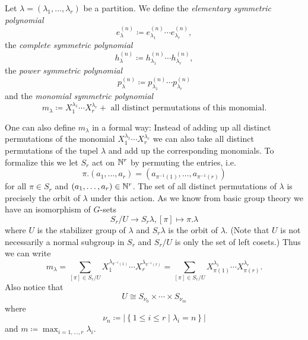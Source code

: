 \begin{defi}
  Let $\lambda = (\lambda_1, \dotsc, \lambda_r)$ be a partition. We define the \emph{elementary symmetric polynomial}
  \[
              e^{(n)}_\lambda
    \coloneqq e^{(n)}_{\lambda_1} \dotsm e^{(n)}_{\lambda_r},
  \]
  the \emph{complete symmetric polynomial}
  \[
              h^{(n)}_\lambda
    \coloneqq h^{(n)}_{\lambda_1} \dotsm h^{(n)}_{\lambda_r},
  \]
  the \emph{power symmetric polynomial}
  \[
              p^{(n)}_\lambda
    \coloneqq p^{(n)}_{\lambda_1} \dotsm p^{(n)}_{\lambda_r}
  \]
  and the \emph{monomial symmetric polynomial}
  \[
              m_\lambda
    \coloneqq   X_1^{\lambda_1} \dotsm X_r^{\lambda_r}
              + \text{ all distinct permutations of this monomial}.
  \]
\end{defi}


One can also define $m_\lambda$ in a formal way:
Instead of adding up all distinct permutations of the monomial $X_1^{\lambda_1} \dotsm X_r^{\lambda_r}$ we can also take all distinct permutations of the tupel $\lambda$ and add up the corresponding monomials.
To formalize this we let $S_r$ act on $\mathbb{N}^r$ by permuting the entries, i.e.\
\[
    \pi.(a_1, \dotsc, a_r)
  = \left( a_{\pi^{-1}(1)}, \dotsc, a_{\pi^{-1}(r)} \right)
\]
for all $\pi \in S_r$ and $(a_1, \dotsc, a_r) \in \mathbb{N}^r$.
The set of all distinct permutations of $\lambda$ is precisely the orbit of $\lambda$ under this action.
As we know from basic group theory we have an isomorphism of $G$-sets
\[
          S_r / U
  \to     S_r \lambda,
          [\pi]
  \mapsto \pi.\lambda
\]
where $U$ is the stabilizer group of $\lambda$ and $S_r \lambda$ is the orbit of $\lambda$.
(Note that $U$ is not necessarily a normal subgroup in $S_r$ and $S_r/U$ is only the set of left cosets.)
Thus we can write
\[
    m_\lambda
  = \sum_{[\pi] \in S_r/U} X_1^{\lambda_{\pi^{-1}(1)}} \dotsm X_r^{\lambda_{\pi^{-1}(r)}}
  = \sum_{[\pi] \in S_r/U} X_{\pi(1)}^{\lambda_1} \dotsm X_{\pi(r)}^{\lambda_r}.
\]
Also notice that
\[
        U
  \cong S_{\nu_0} \times \dotsb \times S_{\nu_m}
\]
where
\[
            \nu_n
  \coloneqq \left|
              \left\{
                1 \leq i \leq r
              \mid
                  \lambda_i
                = n
              \right\}
            \right|
\]
and $m \coloneqq \max_{i=1,\dotsc,r} \lambda_i$.


